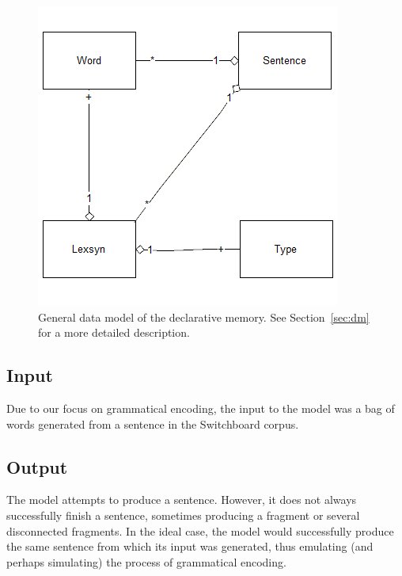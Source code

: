 \begin{figure}[ht]
\begin{center}
\includegraphics[width=0.95\columnwidth]{figures/prodtypes}
\end{center}
\caption{General data model of the declarative memory. See Section~\ref{sec:dm} for a more detailed description.}  
\label{fig:dm}
\end{figure}

\subsection{Input}
Due to our focus on grammatical encoding, the input to the model was a bag of words generated from a sentence in the Switchboard corpus. 

\subsection{Output}
The model attempts to produce a sentence. However, it does not always successfully finish a sentence, sometimes producing a fragment or several disconnected fragments. In the ideal case, the model would successfully produce the same sentence from which its input was generated, thus emulating (and perhaps simulating) the process of grammatical encoding.



